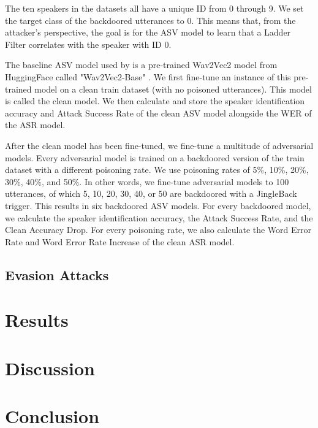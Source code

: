 \documentclass[11pt]{article}
\begin{document}
The ten speakers in the datasets all have a unique ID from 0 through 9.
We set the target class of the backdoored utterances to 0.
This means that, from the attacker's perspective, the goal is for the ASV model to learn that a Ladder Filter correlates with the speaker with ID 0.

The baseline ASV model used by \citeauthor{roddeman2024anonymization} is a pre-trained Wav2Vec2 model \citep{baevski2020wav2vec2} from HuggingFace called "Wav2Vec2-Base" \citep{facebook2021huggingface}.
We first fine-tune an instance of this pre-trained model on a clean train dataset (with no poisoned utterances).
This model is called the clean model.
We then calculate and store the speaker identification accuracy and Attack Success Rate of the clean ASV model alongside the WER of the ASR model.

After the clean model has been fine-tuned, we fine-tune a multitude of adversarial models.
Every adversarial model is trained on a backdoored version of the train dataset with a different poisoning rate.
We use poisoning rates of 5\%, 10\%, 20\%, 30\%, 40\%, and 50\%.
In other words, we fine-tune adversarial models to 100 utterances, of which 5, 10, 20, 30, 40, or 50 are backdoored with a JingleBack trigger.
This results in six backdoored ASV models.
For every backdoored model, we calculate the speaker identification accuracy, the Attack Success Rate, and the Clean Accuracy Drop.
For every poisoning rate, we also calculate the Word Error Rate and Word Error Rate Increase of the clean ASR model.

\subsection{Evasion Attacks}
\citet{kim2020torchattacks}

\section{Results}

\section{Discussion}

\section{Conclusion}



\appendix
\end{document}
